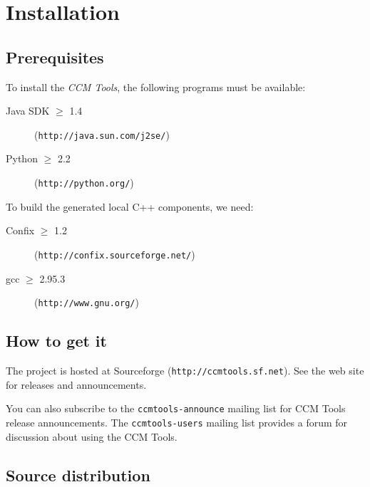 
\chapter{Installation}

\section{Prerequisites}

To install the {\it CCM Tools}, the following programs must be available:
\begin{description}
\item [Java SDK $\ge$ 1.4] ({\tt http://java.sun.com/j2se/})
\item [Python $\ge$ 2.2] ({\tt http://python.org/})
\end{description}

To build the generated local C++ components, we need:
\begin{description}
\item [Confix $\ge$ 1.2] ({\tt http://confix.sourceforge.net/})
\item [gcc $\ge$ 2.95.3] ({\tt http://www.gnu.org/})
\end{description}


\section{How to get it}

The project is hosted at Sourceforge ({\tt http://ccmtools.sf.net}). See the web
site for releases and announcements.

You can also subscribe to the {\tt ccmtools-announce} mailing list for CCM Tools
release announcements. The {\tt ccmtools-users} mailing list provides a forum
for discussion about using the CCM Tools.

\section{Source distribution}

